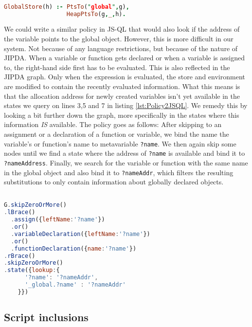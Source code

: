 \begin{lstlisting}[label={lst:Policy2GK},language=Prolog,caption=Policy 2 in GateKeeper,mathescape=true]  % float=t?

GlobalStore(h) :- PtsTo("global",g),
                  HeapPtsTo(g,_,h).
\end{lstlisting}

We could write a similar policy in JS-QL that would also look if the address of the variable points to the global object. However, this is more difficult in our system. Not because of any language restrictions, but because of the nature of JIPDA. When a variable or function gets declared or when a variable is assigned to, the right-hand side first has to be evaluated. This is also reflected in the JIPDA graph. Only when the expression is evaluated, the store and environment are modified to contain the recently evaluated information. What this means is that the allocation address for newly created variables isn't yet available in the states we query on lines 3,5 and 7 in listing \ref{lst:Policy2JSQL}. We remedy this by looking a bit further down the graph, more specifically in the states where this information \textit{IS} available. The policy goes as follows: After skipping to an assignment or a declaration of a function or variable, we bind the name the variable's or function's name to metavariable \texttt{?name}. We then again skip some nodes until we find a state where the address of \texttt{?name} is available and bind it to \texttt{?nameAddress}. Finally, we search for the variable or function with the same name in the global object and also bind it to \texttt{?nameAddr}, which filters the resulting substitutions to only contain information about globally declared objects.

\begin{lstlisting}[label={lst:Policy2JSQL},language=JavaScript,caption=Policy 2 in JS-QL,mathescape=true]  % float=t?

G.skipZeroOrMore()
.lBrace()
  .assign({leftName:'?name'})
  .or()
  .variableDeclaration({leftName:'?name'})
  .or()
  .functionDeclaration({name:'?name'})
.rBrace()
.skipZeroOrMore()
.state({lookup:{
      '?name': '?nameAddr',
      '_global.?name' : '?nameAddr'
    }})
\end{lstlisting}

\subsection{Script inclusions}
\label{subsec:ScriptInclusion}

